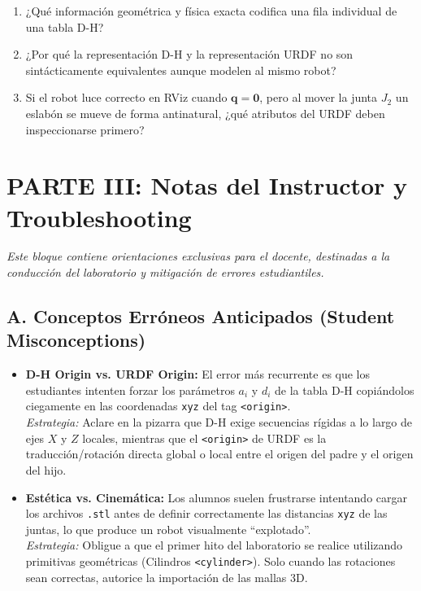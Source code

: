 \documentclass[11pt, a4paper]{article}
\begin{document}
\vspace{0.5cm}
\begin{tcolorbox}[colback=white, colframe=ucbblue, title=\textbf{Comprobación de Salida (Exit Check Formativo)}]
    \begin{enumerate}
        \item ¿Qué información geométrica y física exacta codifica una fila individual de una tabla D-H?
        \item ¿Por qué la representación D-H y la representación URDF no son sintácticamente equivalentes aunque modelen al mismo robot?
        \item Si el robot luce correcto en RViz cuando $\mathbf{q} = \mathbf{0}$, pero al mover la junta $J_2$ un eslabón se mueve de forma antinatural, ¿qué atributos del URDF deben inspeccionarse primero?
    \end{enumerate}
\end{tcolorbox}

\newpage
\section*{PARTE III: Notas del Instructor y Troubleshooting}
\textit{Este bloque contiene orientaciones exclusivas para el docente, destinadas a la conducción del laboratorio y mitigación de errores estudiantiles.}

\subsection*{A. Conceptos Erróneos Anticipados (Student Misconceptions)}
\begin{itemize}
    \item \textbf{D-H Origin vs. URDF Origin:} El error más recurrente es que los estudiantes intenten forzar los parámetros $a_i$ y $d_i$ de la tabla D-H copiándolos ciegamente en las coordenadas \texttt{xyz} del tag \texttt{<origin>}. \\
    \textit{Estrategia:} Aclare en la pizarra que D-H exige secuencias rígidas a lo largo de ejes $X$ y $Z$ locales, mientras que el \texttt{<origin>} de URDF es la traducción/rotación directa global o local entre el origen del padre y el origen del hijo.
    \item \textbf{Estética vs. Cinemática:} Los alumnos suelen frustrarse intentando cargar los archivos \texttt{.stl} antes de definir correctamente las distancias \texttt{xyz} de las juntas, lo que produce un robot visualmente ``explotado''. \\
    \textit{Estrategia:} Obligue a que el primer hito del laboratorio se realice utilizando primitivas geométricas (Cilindros \texttt{<cylinder>}). Solo cuando las rotaciones sean correctas, autorice la importación de las mallas 3D.
\end{itemize}
\end{document}

